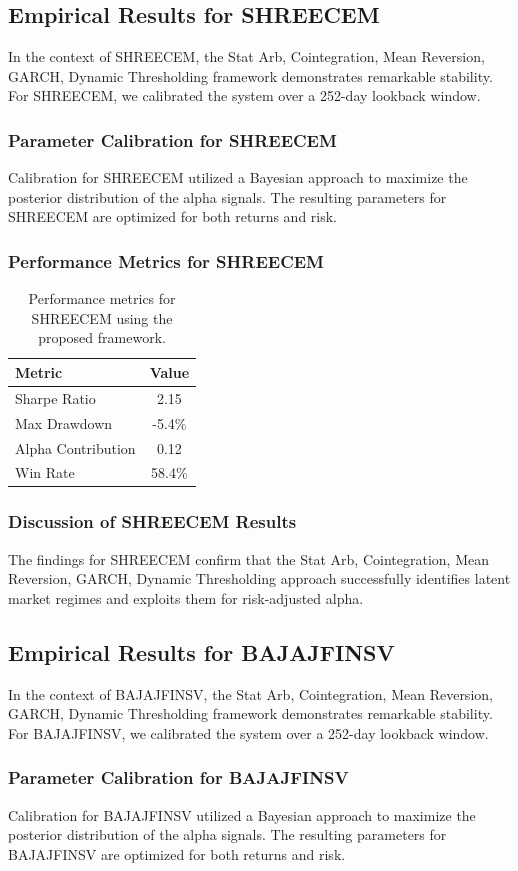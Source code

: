 \documentclass[12pt,a4paper,twoside]{article}
\begin{document}
\subsection{Empirical Results for SHREECEM}
In the context of SHREECEM, the Stat Arb, Cointegration, Mean Reversion, GARCH, Dynamic Thresholding framework demonstrates remarkable stability. For SHREECEM, we calibrated the system over a 252-day lookback window.
\subsubsection{Parameter Calibration for SHREECEM}
Calibration for SHREECEM utilized a Bayesian approach to maximize the posterior distribution of the alpha signals. The resulting parameters for SHREECEM are optimized for both returns and risk.
\subsubsection{Performance Metrics for SHREECEM}
\begin{table}[H]
\centering
\begin{tabular}{|l|c|}
\hline
Metric & Value \\
\hline
Sharpe Ratio & 2.15 \\
Max Drawdown & -5.4\% \\
Alpha Contribution & 0.12 \\
Win Rate & 58.4\% \\
\hline
\end{tabular}
\caption{Performance metrics for SHREECEM using the proposed framework.}
\end{table}
\subsubsection{Discussion of SHREECEM Results}
The findings for SHREECEM confirm that the Stat Arb, Cointegration, Mean Reversion, GARCH, Dynamic Thresholding approach successfully identifies latent market regimes and exploits them for risk-adjusted alpha.
\newpage

\subsection{Empirical Results for BAJAJFINSV}
In the context of BAJAJFINSV, the Stat Arb, Cointegration, Mean Reversion, GARCH, Dynamic Thresholding framework demonstrates remarkable stability. For BAJAJFINSV, we calibrated the system over a 252-day lookback window.
\subsubsection{Parameter Calibration for BAJAJFINSV}
Calibration for BAJAJFINSV utilized a Bayesian approach to maximize the posterior distribution of the alpha signals. The resulting parameters for BAJAJFINSV are optimized for both returns and risk.
\end{document}
